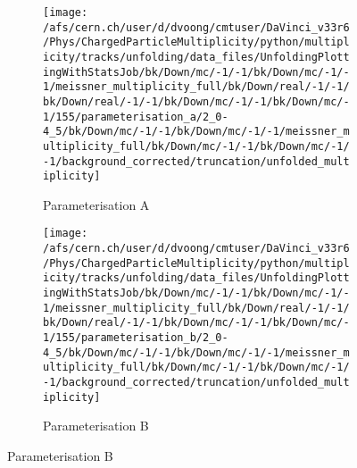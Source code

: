 \begin{table}
	\begin{subtable}{0.49\textwidth}
		\centering
		\caption{Parameterisation F}
		
	\end{subtable}
\end{table}

\begin{figure}[H]
	\centering
	\begin{subfigure}{0.49\textwidth}
		\texttt{[image: /afs/cern.ch/user/d/dvoong/cmtuser/DaVinci\_v33r6/Phys/ChargedParticleMultiplicity/python/multiplicity/tracks/unfolding/data\_files/UnfoldingPlottingWithStatsJob/bk/Down/mc/-1/-1/bk/Down/mc/-1/-1/meissner\_multiplicity\_full/bk/Down/real/-1/-1/bk/Down/real/-1/-1/bk/Down/mc/-1/-1/bk/Down/mc/-1/155/parameterisation\_a/2\_0-4\_5/bk/Down/mc/-1/-1/bk/Down/mc/-1/-1/meissner\_multiplicity\_full/bk/Down/mc/-1/-1/bk/Down/mc/-1/-1/background\_corrected/truncation/unfolded\_multiplicity]}
		\caption{Parameterisation A}
	\end{subfigure}
	\begin{subfigure}{0.49\textwidth}
		\texttt{[image: /afs/cern.ch/user/d/dvoong/cmtuser/DaVinci\_v33r6/Phys/ChargedParticleMultiplicity/python/multiplicity/tracks/unfolding/data\_files/UnfoldingPlottingWithStatsJob/bk/Down/mc/-1/-1/bk/Down/mc/-1/-1/meissner\_multiplicity\_full/bk/Down/real/-1/-1/bk/Down/real/-1/-1/bk/Down/mc/-1/-1/bk/Down/mc/-1/155/parameterisation\_b/2\_0-4\_5/bk/Down/mc/-1/-1/bk/Down/mc/-1/-1/meissner\_multiplicity\_full/bk/Down/mc/-1/-1/bk/Down/mc/-1/-1/background\_corrected/truncation/unfolded\_multiplicity]}
		\caption{Parameterisation B}
	\end{subfigure}

\end{figure}
